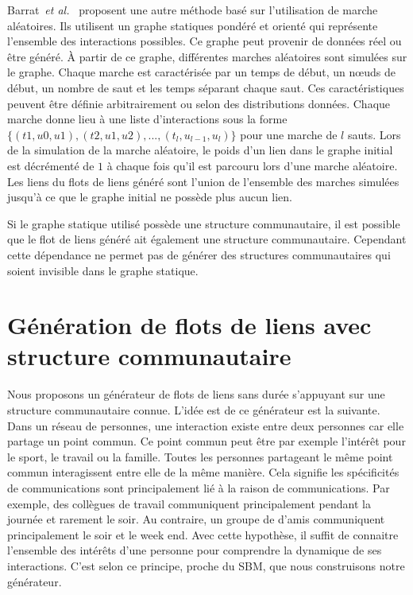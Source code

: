 Barrat~\emph{et al.}~\cite{Barrat2013a} proposent une autre méthode basé sur l'utilisation de marche aléatoires.
Ils utilisent un graphe statiques pondéré et orienté qui représente l'ensemble des interactions possibles.
Ce graphe peut provenir de données réel ou être généré.
\`A partir de ce graphe, différentes marches aléatoires sont simulées sur le graphe.
Chaque marche est caractérisée par un temps de début, un n\oe uds de début, un nombre de saut et les temps séparant chaque saut.
Ces caractéristiques peuvent être définie arbitrairement ou selon des distributions données.
Chaque marche donne lieu à une liste d'interactions sous la forme $\{(t1,u0,u1), (t2,u1,u2), ..., (t_l,u_{l-1}, u_l)\}$ pour une marche de $l$ sauts.
Lors de la simulation de la marche aléatoire, le poids d'un lien dans le graphe initial est décrémenté de $1$ à chaque fois qu'il est parcouru lors d'une marche aléatoire.
Les liens du flots de liens généré sont l'union de l'ensemble des marches simulées jusqu'à ce que le graphe initial ne possède plus aucun lien.

Si le graphe statique utilisé possède une structure communautaire, il est possible que le flot de liens généré ait également une structure communautaire.
Cependant cette dépendance ne permet pas de générer des structures communautaires qui soient invisible dans le graphe statique.


\section{Génération de flots de liens avec structure communautaire}
\label{sec:versqualite_methode}

Nous proposons un générateur de flots de liens sans durée s'appuyant sur une structure communautaire connue.
L'idée est de ce générateur est la suivante.
Dans un réseau de personnes, une interaction existe entre deux personnes car elle partage un point commun.
Ce point commun peut être par exemple l'intérêt pour le sport, le travail ou la famille.
Toutes les personnes partageant le même point commun interagissent entre elle de la même manière.
Cela signifie les spécificités de communications sont principalement lié à la raison de communications.
Par exemple, des collègues de travail communiquent principalement pendant la journée et rarement le soir.
Au contraire, un groupe de d'amis communiquent principalement le soir et le week end.
Avec cette hypothèse, il suffit de connaitre l'ensemble des intérêts d'une personne pour comprendre la dynamique de ses interactions.
C'est selon ce principe, proche du SBM, que nous construisons notre générateur.


